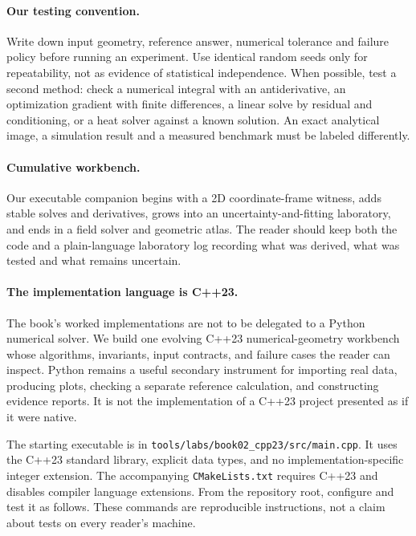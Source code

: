 \paragraph{Our testing convention.}
Write down input geometry, reference answer, numerical tolerance and
failure policy before running an experiment. Use identical random seeds
only for repeatability, not as evidence of statistical independence.
When possible, test a second method: check a numerical integral with an
antiderivative, an optimization gradient with finite differences, a linear
solve by residual and conditioning, or a heat solver against a known
solution. An exact analytical image, a simulation result and a measured
benchmark must be labeled differently.

\paragraph{Cumulative workbench.}
Our executable companion begins with a 2D coordinate-frame witness,
adds stable solves and derivatives, grows into an uncertainty-and-fitting
laboratory, and ends in a field solver and geometric atlas. The reader
should keep both the code and a plain-language laboratory log recording
what was derived, what was tested and what remains uncertain.


\begin{booktwoconcept}
\paragraph{The implementation language is C++23.}
The book's worked implementations are not to be delegated to a Python
numerical solver. We build one evolving C++23 numerical-geometry workbench
whose algorithms, invariants, input contracts, and failure cases the reader
can inspect. Python remains a useful secondary instrument for importing
real data, producing plots, checking a separate reference calculation, and
constructing evidence reports. It is not the implementation of a C++23
project presented as if it were native.

\end{booktwoconcept}

The starting executable is in
\texttt{tools/labs/book02\_cpp23/src/main.cpp}. It uses the C++23 standard
library, explicit data types, and no implementation-specific integer
extension. The accompanying \texttt{CMakeLists.txt} requires C++23 and
disables compiler language extensions. From the repository root, configure
and test it as follows. These commands are reproducible instructions, not
a claim about tests on every reader's machine.

